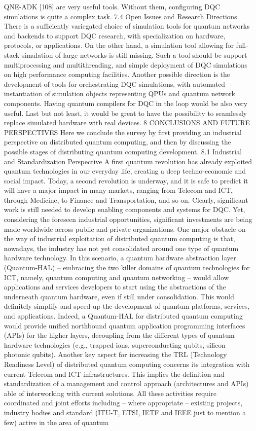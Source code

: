 QNE-ADK [108] are very useful tools. Without them, configuring DQC simulations is quite a complex task. 7.4 Open Issues and Research Directions There is a sufficiently variegated choice of simulation tools for quantum networks and backends to support DQC research, with specialization on hardware, protocols, or applications. On the other hand, a simulation tool allowing for full-stack simulation of large networks is still missing. Such a tool should be support multiprocessing and multithreading, and simple deployment of DQC simulations on high performance computing facilities. Another possible direction is the development of tools for orchestrating DQC simulations, with automated instantiation of simulation objects representing QPUs and quantum network components. Having quantum compilers for DQC in the loop would be also very useful. Last but not least, it would be great to have the possibility to seamlessly replace simulated hardware with real devices. 8 CONCLUSIONS AND FUTURE PERSPECTIVES Here we conclude the survey by first providing an industrial perspective on distributed quantum computing, and then by discussing the possible stages of distributing quantum computing development. 8.1 Industrial and Standardization Perspective A first quantum revolution has already exploited quantum technologies in our everyday life, creating a deep techno-economic and social impact. Today, a second revolution is underway, and it is safe to predict it will have a major impact in many markets, ranging from Telecom and ICT, through Medicine, to Finance and Transportation, and so on. Clearly, significant work is still needed to develop enabling components and systems for DQC. Yet, considering the foreseen industrial opportunities, significant investments are being made worldwide across public and private organizations. One major obstacle on the way of industrial exploitation of distributed quantum computing is that, nowadays, the industry has not yet consolidated around one type of quantum hardware technology. In this scenario, a quantum hardware abstraction layer (Quantum-HAL) – embracing the two killer domains of quantum technologies for ICT, namely, quantum computing and quantum networking – would allow applications and services developers to start using the abstractions of the underneath quantum hardware, even if still under consolidation. This would definitely simplify and speed-up the development of quantum platforms, services, and applications. Indeed, a Quantum-HAL for distributed quantum computing would provide unified northbound quantum application programming interfaces (APIs) for the higher layers, decoupling from the different types of quantum hardware technologies (e.g., trapped ions, superconducting qubits, silicon photonic qubits). Another key aspect for increasing the TRL (Technology Readiness Level) of distributed quantum computing concerns its integration with current Telecom and ICT infrastructures. This implies the definition and standardization of a management and control approach (architectures and APIs) able of interworking with current solutions. All these activities require coordinated and joint efforts including – where appropriate – existing projects, industry bodies and standard (ITU-T, ETSI, IETF and IEEE just to mention a few) active in the area of quantum 